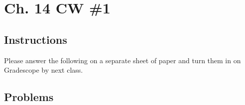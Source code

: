 \documentclass{article}
\begin{document}

\section*{Ch. 14 CW \#1}

\subsection*{Instructions} Please answer the following on a separate sheet of paper and turn them in on Gradescope by next class.

\subsection*{Problems}
\end{document}
